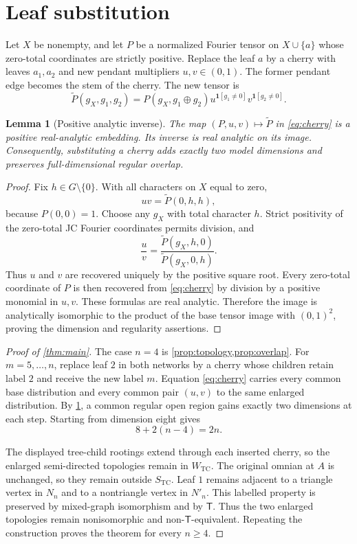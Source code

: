 \documentclass[11pt]{article}
\newtheorem{lemma}[theorem]{Lemma}
\theoremstyle{remark}
\newcommand{\TCw}{W_{\mathrm{TC}}}
\newcommand{\TCs}{S_{\mathrm{TC}}}
\newcommand{\Tmove}{\mathsf T}
\newcommand{\xor}{\mathbin\oplus}
\begin{document}
\section{Leaf substitution}

Let $X$ be nonempty, and let $P$ be a normalized Fourier tensor on
$X\cup\{a\}$ whose zero-total coordinates are strictly positive.  Replace
the leaf $a$ by a cherry with leaves $a_1,a_2$ and new pendant multipliers
$u,v\in(0,1)$.  The former pendant edge becomes the stem of the cherry.  The
new tensor is
\begin{equation}\label{eq:cherry}
\widetilde P(g_X,g_1,g_2)=
P(g_X,g_1\xor g_2)
u^{\mathbf1[g_1\ne0]}v^{\mathbf1[g_2\ne0]}.
\end{equation}

\begin{lemma}[Positive analytic inverse]\label{lem:cherry}
The map $(P,u,v)\mapsto\widetilde P$ in \eqref{eq:cherry} is a positive
real-analytic embedding.  Its inverse is real analytic on its image.
Consequently, substituting a cherry adds exactly two model dimensions and
preserves full-dimensional regular overlap.
\end{lemma}

\begin{proof}
Fix $h\in G\setminus\{0\}$.  With all characters on $X$ equal to zero,
\[
uv=\widetilde P(0,h,h),
\]
because $P(0,0)=1$.  Choose any $g_X$ with total character $h$.  Strict
positivity of the zero-total JC Fourier coordinates permits division, and
\[
\frac uv=
\frac{\widetilde P(g_X,h,0)}{\widetilde P(g_X,0,h)}.
\]
Thus $u$ and $v$ are recovered uniquely by the positive square root.  Every
zero-total coordinate of $P$ is then recovered from \eqref{eq:cherry} by
division by a positive monomial in $u,v$.  These formulas are real analytic.  Therefore
the image is analytically isomorphic to the product of the base tensor image
with $(0,1)^2$, proving the dimension and regularity assertions.
\end{proof}

\begin{proof}[Proof of \cref{thm:main}]
The case $n=4$ is \cref{prop:topology,prop:overlap}.  For
$m=5,\ldots,n$, replace leaf $2$ in both networks by a cherry whose children
retain label $2$ and receive the new label $m$.  Equation \eqref{eq:cherry}
carries every common base distribution and every common pair $(u,v)$ to the
same enlarged distribution.  By
\cref{lem:cherry}, a common regular open region gains exactly two dimensions
at each step.  Starting from dimension eight gives
\[
8+2(n-4)=2n.
\]

The displayed tree-child rootings extend through each inserted cherry, so
the enlarged semi-directed topologies remain in $\TCw$.  The original
omnian at $A$ is unchanged, so they remain outside $\TCs$.  Leaf $1$ remains
adjacent to a triangle vertex in $N_n$ and to a nontriangle vertex in $N'_n$.
This labelled property is preserved by mixed-graph isomorphism and by
$\Tmove$.  Thus the two enlarged
topologies remain nonisomorphic and non-$\Tmove$-equivalent.  Repeating the
construction proves the theorem for every $n\ge4$.
\end{proof}
\end{document}
